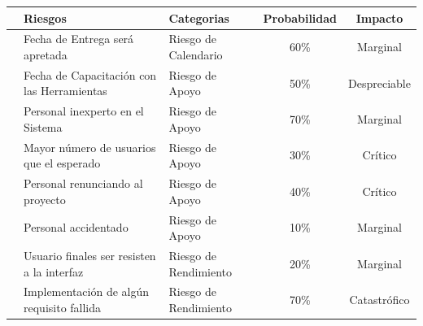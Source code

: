 \documentclass[12pt, fleqn]{report}                             %
\begin{document}
            \begin{tabular}{r ||  m{12em} | m{12em} | c | c }
               &  Riesgos & Categorias & Probabilidad & Impacto \\ [0.5ex] 
               \hline\hline
              
                & Fecha de Entrega será apretada
                & Riesgo de Calendario  
                & 60\%
                & Marginal
                \\
                \hline

                & Fecha de Capacitación con las Herramientas
                & Riesgo de Apoyo  
                & 50\%
                & Despreciable
                \\
                \hline

                & Personal inexperto en el Sistema
                & Riesgo de Apoyo  
                & 70\%
                & Marginal
                \\
                \hline

                & Mayor número de usuarios que el esperado
                & Riesgo de Apoyo
                & 30\%
                & Crítico
                \\
                \hline

                & Personal renunciando al proyecto
                & Riesgo de Apoyo
                & 40\%
                & Crítico
                \\
                \hline

                & Personal accidentado
                & Riesgo de Apoyo
                & 10\%
                & Marginal
                \\
                \hline

                & Usuario finales ser resisten a la interfaz
                & Riesgo de Rendimiento
                & 20\%
                & Marginal
                \\
                \hline

                & Implementación de algún requisito fallida
                & Riesgo de Rendimiento
                & 70\%
                & Catastrófico
                \\
                \hline

            \end{tabular}

        \clearpage
\end{document}

